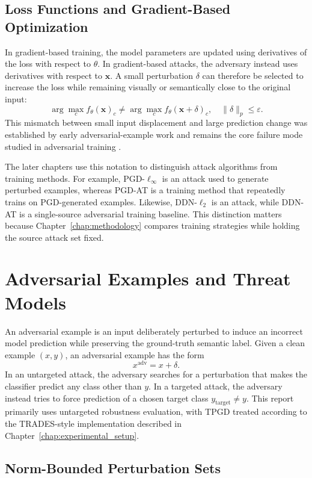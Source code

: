 \subsection{Loss Functions and Gradient-Based Optimization}

In gradient-based training, the model parameters are updated using derivatives of the loss with respect to $\theta$. In gradient-based attacks, the adversary instead uses derivatives with respect to $\mathbf{x}$. A small perturbation $\delta$ can therefore be selected to increase the loss while remaining visually or semantically close to the original input:
\[
\arg\max_c f_\theta(\mathbf{x})_c
\neq
\arg\max_c f_\theta(\mathbf{x}+\delta)_c,
\quad
\|\delta\|_p\leq \varepsilon .
\]
This mismatch between small input displacement and large prediction change was established by early adversarial-example work and remains the core failure mode studied in adversarial training \cite{szegedy2014intriguing,goodfellow2015explaining}.

The later chapters use this notation to distinguish attack algorithms from training methods. For example, PGD-$\ell_\infty$ is an attack used to generate perturbed examples, whereas PGD-AT is a training method that repeatedly trains on PGD-generated examples. Likewise, DDN-$\ell_2$ is an attack, while DDN-AT is a single-source adversarial training baseline. This distinction matters because Chapter~\ref{chap:methodology} compares training strategies while holding the source attack set fixed.

\section{Adversarial Examples and Threat Models}

An adversarial example is an input deliberately perturbed to induce an incorrect model prediction while preserving the ground-truth semantic label. Given a clean example $(x,y)$, an adversarial example has the form
\[
x^{\mathrm{adv}}=x+\delta .
\]
In an untargeted attack, the adversary searches for a perturbation that makes the classifier predict any class other than $y$. In a targeted attack, the adversary instead tries to force prediction of a chosen target class $y_{\mathrm{target}}\neq y$. This report primarily uses untargeted robustness evaluation, with TPGD treated according to the TRADES-style implementation described in Chapter~\ref{chap:experimental_setup}.

\subsection{Norm-Bounded Perturbation Sets}

